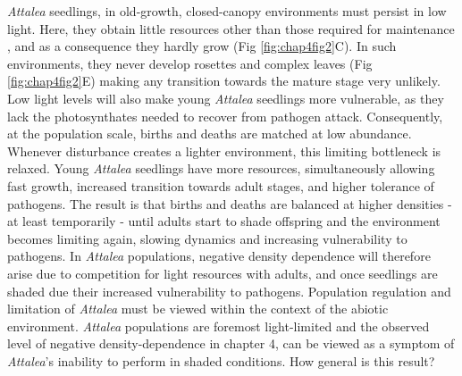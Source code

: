 \documentclass[b5paper,justified]{tufte-book} %
\begin{document}
\begin{fullwidth}
\textit{Attalea} seedlings, in old-growth, closed-canopy environments must persist in low light. Here, they obtain little resources other than those required for maintenance \citep{Araus1994}, and as a consequence they hardly grow (Fig  \ref{fig:chap4fig2}C). In such environments, they never develop rosettes and complex leaves (Fig \ref{fig:chap4fig2}E) making any transition towards the mature stage very unlikely. Low light levels will also make young \textit{Attalea} seedlings more vulnerable, as they lack the photosynthates needed to recover from pathogen attack. Consequently, at the population scale, births and deaths are matched at low abundance. Whenever disturbance creates a lighter environment, this limiting bottleneck is relaxed. Young \textit{Attalea} seedlings have more resources, simultaneously allowing fast growth, increased transition towards adult stages, and higher tolerance of pathogens. The result is that births and deaths are balanced at higher densities - at least temporarily - until adults start to shade offspring and the environment becomes limiting again, slowing dynamics and increasing vulnerability to pathogens. In \textit{Attalea} populations, negative density dependence will therefore arise due to competition for light resources with adults, and once seedlings are shaded due their increased vulnerability to pathogens.  Population regulation and limitation of \textit{Attalea} must be viewed within the context of the abiotic environment.  \textit{Attalea} populations are foremost light-limited and the observed level of negative density-dependence in chapter 4, can be viewed as a symptom of \textit{Attalea}'s inability to perform in shaded conditions. How general is this result? \end{fullwidth}  
 
\end{document}
